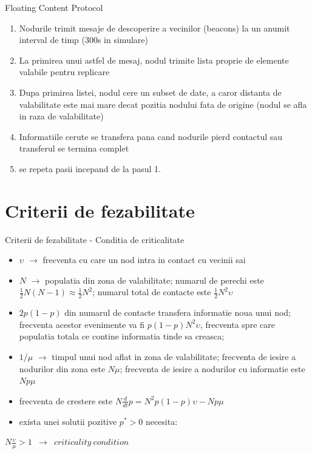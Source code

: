 \documentclass{beamer}
\begin{document}
\begin{frame}{Floating Content Protocol}
	\begin{enumerate}
	  \item Nodurile trimit mesaje de descoperire a vecinilor (beacons) la un
	  anumit interval de timp (300s in simulare)
	  \item La primirea unui astfel de mesaj, nodul trimite lista proprie de
	  elemente valabile pentru replicare
	  \item Dupa primirea listei, nodul cere un subset de date, a caror distanta de
	  valabilitate este mai mare decat pozitia nodului fata de origine (nodul se
	  afla in raza de valabilitate)
	  \item Informatiile cerute se transfera pana cand nodurile pierd contactul sau
	  transferul se termina complet
	  \item se repeta pasii incepand de la pasul 1.
	\end{enumerate}
\end{frame}


\section {Criterii de fezabilitate}
\begin{frame}{Criterii de fezabilitate - Conditia de criticalitate}
	\begin{itemize}
	  \item $\upsilon$ $\rightarrow$ frecventa cu care un nod intra in contact cu
	  vecinii sai
	  \item $N$ $\rightarrow$ populatia din zona de valabilitate; numarul de
	  perechi este $\frac{1}{2}N(N-1) \approx \frac{1}{2}N^2$; numarul total de
	  contacte este $\frac{1}{2}N^2\upsilon$
	  \item $2p(1-p)$ din numarul de contacte transfera informatie noua unui nod;
	  frecventa acestor evenimente va fi $p(1-p)N^2\upsilon$, frecventa spre care
	  populatia totala ce contine informatia tinde sa creasca;
	  \item $1/\mu$ $\rightarrow$ timpul unui nod aflat in zona de valabilitate;
	  frecventa de iesire a nodurilor din zona este $N\mu$; frecventa de iesire a
	  nodurilor cu informatie este $Np\mu$
	  \item frecventa de crestere este $N\frac{d}{dt}p = N^2p(1-p)\upsilon - Np\mu$
	  \item exista unei solutii pozitive $p^* > 0$ necesita:
	\end{itemize}
	\hskip0.5in
	\small{
		\begin{beamerboxesrounded}[lower=block body,shadow=true,width=3.2in]{}
			\begin{center}
				\texttt{$N\frac{\upsilon}{\mu} > 1$ $\rightarrow$ $criticality\ condition$}
			\end{center}
		\end{beamerboxesrounded}
	}
\end{frame}
\end{document}
